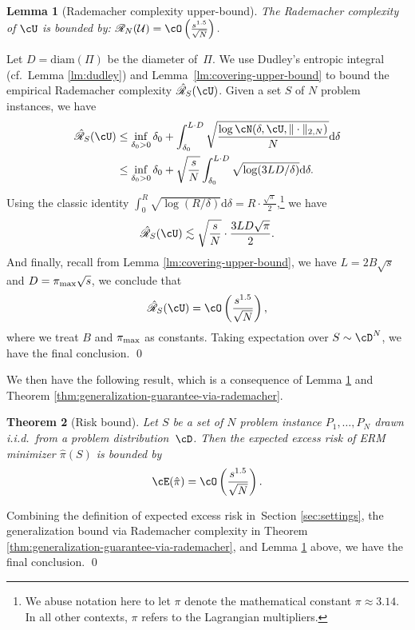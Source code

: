 \documentclass{article}
\theoremstyle{plain}
\newtheorem{theorem}{Theorem}[section]
\newtheorem{lemma}[theorem]{Lemma}
\theoremstyle{definition}
\theoremstyle{remark}
\begin{document}
\begin{lemma}[Rademacher complexity upper-bound] \label{lm:empirical-rademacher-complexity-upper-bound}
    The Rademacher complexity of $\cU$ is bounded by:
    $\mathscr{R}_N(\mathcal U) = \cO\left(\frac{s^{1.5}}{\sqrt{N}}\right).$
\end{lemma}
    Let $D = \mathrm{diam}(\Pi)$ be the diameter of~$\Pi$. We use Dudley's entropic integral (cf.~Lemma \ref{lm:dudley}) and Lemma~\ref{lm:covering-upper-bound} to bound the empirical Rademacher complexity $\hat{\mathscr{R}}_S(\cU)$. Given a set $S$ of $N$ problem instances, we have
    \begin{equation*}
        \begin{aligned}
            \hat{\mathscr{R}}_S(\cU) &\leq \inf_{\delta_0 > 0} \delta_0 + \int_{\delta_0}^{L \cdot D}\sqrt{\frac{\log \cN(\delta, \cU, \|\cdot\|_{2, N})}{N}} \mathrm{d}\delta \\
            &\leq \inf_{\delta_0 > 0} \delta_0 + \sqrt{\frac{s}{N}} \int_{\delta_0}^{L \cdot D}\sqrt{\log(3LD/\delta)} \mathrm{d}\delta.
        \end{aligned}
    \end{equation*}
    Using the classic identity $\int_{0}^R \sqrt{\log (R/\delta)} \mathrm{d}\delta = R\cdot \frac{\sqrt{\pi}}{2}$,\footnote{We abuse notation here to let $\pi$ denote the mathematical constant $\pi \approx 3.14$. In all other contexts, $\pi$ refers to the Lagrangian multipliers.} we have
    \[
        \hat{\mathscr{R}}_S(\cU) \lesssim \sqrt{\frac{s}{N}} \cdot \frac{3LD\sqrt{\pi}}{2} .
    \]
    And finally, recall from Lemma \ref{lm:covering-upper-bound}, we have $L = 2B\sqrt{s}$ and $D = \pi_\textup{max}\sqrt{s}$, we conclude that
    \[
        \hat{\mathscr{R}}_S(\cU) = \cO\left(\frac{s^{1.5}}{\sqrt{N }}\right),
    \]
    where we treat $B$ and  $\pi_\textup{max}$ as constants. Taking expectation over $S \sim \cD^N$, we have the final conclusion. 
\qed

We then have the following result, which is a consequence of Lemma \ref{lm:empirical-rademacher-complexity-upper-bound} and Theorem \ref{thm:generalization-guarantee-via-rademacher}.

\begin{theorem}[Risk bound]\label{thm:upper-bound-learning-lagrangian}
    Let $S$ be a set of $N$ problem instance $P_1, \dots, P_N$ drawn i.i.d.~from a problem distribution~$\cD$. Then the expected excess risk of ERM minimizer $\hat{\pi}(S)$ is bounded by
    \[
        \cE(\hat{\pi}) = \cO\left(\frac{s^{1.5}}{\sqrt{N}}\right).
    \]
\end{theorem}
    Combining the definition of expected excess risk in~Section \ref{sec:settings}, the generalization bound via Rademacher complexity in Theorem \ref{thm:generalization-guarantee-via-rademacher}, and Lemma \ref{lm:empirical-rademacher-complexity-upper-bound} above, we have the final conclusion.
\qed
\end{document}
